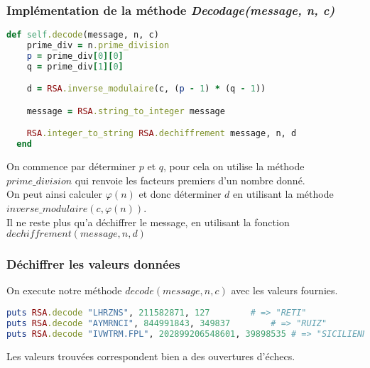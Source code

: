 \documentclass[a4paper,10pt]{article}
\begin{document}
\subsubsection{Implémentation de la méthode \textit{Decodage(message, n, c)}}
\begin{lstlisting}[language=Ruby]
  def self.decode(message, n, c)
    prime_div = n.prime_division
    p = prime_div[0][0]
    q = prime_div[1][0]

    d = RSA.inverse_modulaire(c, (p - 1) * (q - 1))

    message = RSA.string_to_integer message

    RSA.integer_to_string RSA.dechiffrement message, n, d
  end
\end{lstlisting}
On commence par déterminer $p$ et $q$, pour cela on utilise la méthode $prime\_division$ qui renvoie les facteurs premiers d'un nombre donné.\\
On peut ainsi calculer $\varphi(n)$ et donc déterminer $d$ en utilisant la méthode $inverse\_modulaire(c, \varphi(n))$.\\
Il ne reste plus qu'a déchiffrer le message, en utilisant la fonction $dechiffrement(message, n, d)$

\subsubsection{Déchiffrer les valeurs données}
On execute notre méthode $decode(message, n, c)$ avec les valeurs fournies.
\begin{lstlisting}[language=Ruby]
puts RSA.decode "LHRZNS", 211582871, 127		# => "RETI"
puts RSA.decode "AYMRNCI", 844991843, 349837		# => "RUIZ"
puts RSA.decode "IVWTRM.FPL", 202899206548601, 39898535	# => "SICILIENNE"
\end{lstlisting}
Les valeurs trouvées correspondent bien a des ouvertures d'échecs.

\clearpage
\end{document}
